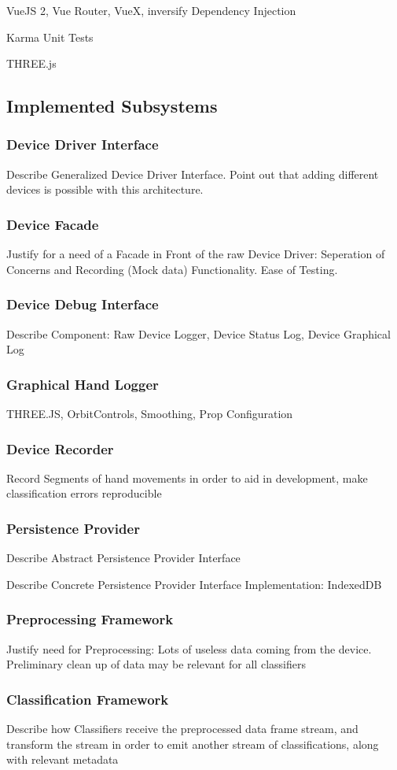 \documentclass[fontsize=12pt,a4paper,draft]{scrartcl}[2018/05/07]
\begin{document}
VueJS 2, Vue Router, VueX, inversify Dependency Injection

Karma Unit Tests

THREE.js
\subsection{Implemented Subsystems}
\subsubsection{Device Driver Interface}
Describe Generalized Device Driver Interface. Point out that adding different devices is possible with this architecture.
\subsubsection{Device Facade}
Justify for a need of a Facade in Front of the raw Device Driver: Seperation of Concerns and Recording (Mock data) Functionality. Ease of Testing.
\subsubsection{Device Debug Interface}
Describe Component: Raw Device Logger, Device Status Log, Device Graphical Log
\subsubsection{Graphical Hand Logger}
THREE.JS, OrbitControls, Smoothing, Prop Configuration
\subsubsection{Device Recorder}
Record Segments of hand movements in order to aid in development, make classification errors reproducible
\subsubsection{Persistence Provider}
Describe Abstract Persistence Provider Interface

Describe Concrete Persistence Provider Interface Implementation: IndexedDB
\subsubsection{Preprocessing Framework}
Justify need for Preprocessing: Lots of useless data coming from the device. Preliminary
clean up of data may be relevant for all classifiers
\subsubsection{Classification Framework}
Describe how Classifiers receive the preprocessed data frame stream, and transform the stream in order to emit another stream of classifications, along with relevant metadata
\end{document}
